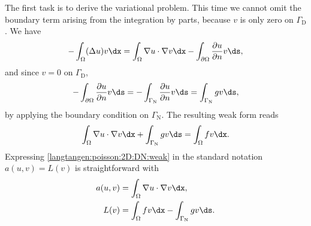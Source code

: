 The first task is to derive the variational problem. This time we cannot
omit the boundary term arising from the integration by parts, because $v$
is only zero on $\Gamma_{\mathrm{D}}$. We have
\begin{equation}
 -\int_\Omega (\Delta u)v \dx
= \int_\Omega\nabla u\cdot\nabla v\dx
  - \int_{\partial\Omega} \frac{\partial u}{\partial n}v\ds,
\end{equation}
and since $v=0$ on $\Gamma_{\mathrm{D}}$,
\begin{equation}
- \int_{\partial\Omega} \frac{\partial u}{\partial n}v\ds
=
- \int_{\Gamma_{\mathrm{N}}} \frac{\partial u}{\partial n}v\ds
= \int_{\Gamma_{\mathrm{N}}}gv\ds,
\end{equation}
by applying the boundary condition on $\Gamma_{\mathrm{N}}$.  The resulting weak
form reads
\begin{equation}
\int_{\Omega} \nabla u \cdot \nabla v \dx +
\int_{\Gamma_{\mathrm{N}}} gv\ds
= \int_{\Omega} fv \dx.
\label{langtangen:poisson:2D:DN:weak}
\end{equation}
Expressing \eqref{langtangen:poisson:2D:DN:weak} in the standard notation
$a(u,v)=L(v)$ is straightforward with
\begin{align}
  a(u, v) &= \int_{\Omega} \nabla u \cdot \nabla v \dx,
  \label{langtangen:poisson2:vard:a}
\\
  L(v) &= \int_{\Omega} fv \dx - \int_{\Gamma_{\mathrm{N}}} gv\ds.
  \label{langtangen:poisson2:vard:L}
\end{align}

